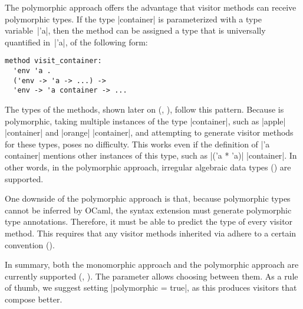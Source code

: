 \documentclass[11pt,a4paper,twoside]{article}
\begin{document}
The polymorphic approach offers the advantage that visitor methods can receive
polymorphic types. If the type \oc|container| is parameterized with a type
variable~\oc|'a|, then the method  can be assigned a
type that is universally quantified in~\oc|'a|, of the following form:
%
\begin{mdframed}[backgroundcolor=green!10]
\begin{lstlisting}
method visit_container:
  'env 'a .
  ('env -> 'a -> ...) ->
  'env -> 'a container -> ...
\end{lstlisting}
\end{mdframed}
%
The types of the  methods, shown later on
(, ), follow this pattern.
%
Because  is polymorphic, taking multiple instances of
the type \oc|container|, such as \oc|apple| \oc|container| and \oc|orange|
\oc|container|, and attempting to generate visitor methods for these types,
poses no difficulty. This works even if the definition of \oc|'a container|
mentions other instances of this type, such as \oc|('a * 'a)| \oc|container|.
In other words, in the polymorphic approach, irregular algebraic data types
() are supported.

One downside of the polymorphic approach is that, because polymorphic types
cannot be inferred by OCaml, the \visitors syntax extension must generate
polymorphic type annotations. Therefore, it must be able to predict
the type of every visitor method.
%
%
This requires that any visitor methods inherited via \ancestors adhere to a
certain convention ().

In summary, both the monomorphic approach and the polymorphic approach are
currently supported (,
). The parameter \polymorphic allows
choosing between them. As a rule of thumb, we suggest setting
%
\oc|polymorphic = true|, as this produces visitors that compose better.



\end{document}
